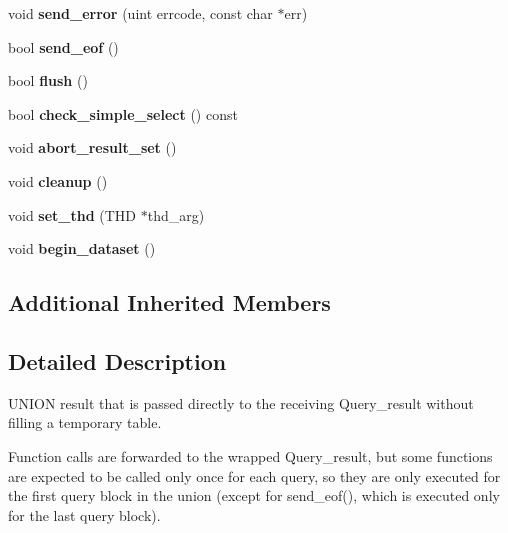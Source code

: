 \begin{DoxyCompactItemize}
void {\bfseries send\+\_\+error} (uint errcode, const char $\ast$err)
\item 
\mbox{\label{classQuery__result__union__direct_a45948265d1b0a5ec4cfec22982db9530}} 
bool {\bfseries send\+\_\+eof} ()
\item 
\mbox{\label{classQuery__result__union__direct_a0b43db0333bd9c587f2c8a86e9a99a6d}} 
bool {\bfseries flush} ()
\item 
\mbox{\label{classQuery__result__union__direct_ab86ff521a323ad6ea6c48ea437cb552e}} 
bool {\bfseries check\+\_\+simple\+\_\+select} () const
\item 
\mbox{\label{classQuery__result__union__direct_a6e3a6836979162a70ed9803debf1217f}} 
void {\bfseries abort\+\_\+result\+\_\+set} ()
\item 
\mbox{\label{classQuery__result__union__direct_a2b65d6c617f13469063698a4a8b9b1f0}} 
void {\bfseries cleanup} ()
\item 
\mbox{\label{classQuery__result__union__direct_a7dd197576188857d8998d346d00271fd}} 
void {\bfseries set\+\_\+thd} (T\+HD $\ast$thd\+\_\+arg)
\item 
\mbox{\label{classQuery__result__union__direct_a1ca8dc47daf96ec47cd3c1fbe7884b93}} 
void {\bfseries begin\+\_\+dataset} ()
\end{DoxyCompactItemize}
\subsection*{Additional Inherited Members}


\subsection{Detailed Description}
U\+N\+I\+ON result that is passed directly to the receiving Query\+\_\+result without filling a temporary table.

Function calls are forwarded to the wrapped Query\+\_\+result, but some functions are expected to be called only once for each query, so they are only executed for the first query block in the union (except for send\+\_\+eof(), which is executed only for the last query block).

